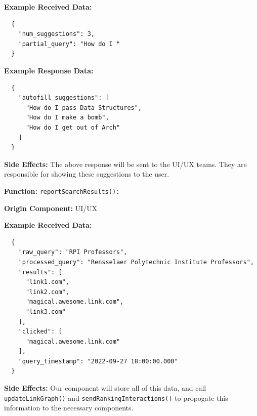 \textbf{Example Received Data:} \begin{verbatim}
  {
    "num_suggestions": 3,
    "partial_query": "How do I "
  }
\end{verbatim}

\textbf{Example Response Data:} \begin{verbatim}
  {
    "autofill_suggestions": [
      "How do I pass Data Structures",
      "How do I make a bomb",
      "How do I get out of Arch"
    ]
  }
\end{verbatim}

\smallskip

\textbf{Side Effects:} The above response will be sent to the UI/UX teams. They are responsible for showing these suggestions to the user.

\newpage
\textbf{Function:} \verb|reportSearchResults():|

\smallskip

\textbf{Origin Component:} UI/UX

\smallskip

\textbf{Example Received Data:} \begin{verbatim}
  {
    "raw_query": "RPI Professors",
    "processed_query": "Rensselaer Polytechnic Institute Professors",
    "results": [
      "link1.com",
      "link2.com", 
      "magical.awesome.link.com",
      "link3.com"
    ],
    "clicked": [
      "magical.awesome.link.com"
    ],
    "query_timestamp": "2022-09-27 18:00:00.000"
  }
\end{verbatim}

\smallskip

\textbf{Side Effects:} Our component will store all of this data, and call \verb|updateLinkGraph()| and \verb|sendRankingInteractions()| to propogate this information to the necessary components.